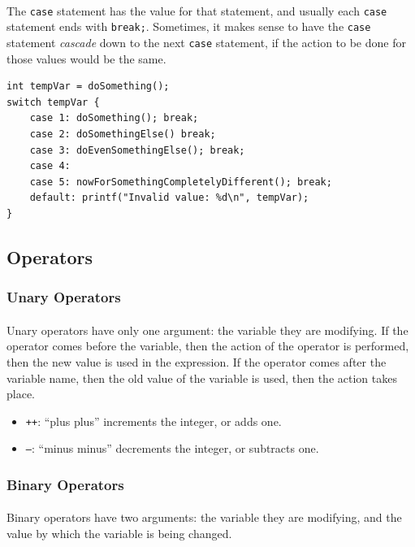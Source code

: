 \documentclass[letter,11pt]{article}
\begin{document}
\paragraph{}The \texttt{case} statement has the value for that statement, and usually each \texttt{case} statement ends with \texttt{break;}. Sometimes, it makes sense to have the \texttt{case} statement \textit{cascade} down to the next \texttt{case} statement, if the action to be done for those values would be the same.

\begin{verbatim}
int tempVar = doSomething();
switch tempVar {
    case 1: doSomething(); break;
    case 2: doSomethingElse() break;
    case 3: doEvenSomethingElse(); break;
    case 4:
    case 5: nowForSomethingCompletelyDifferent(); break;
    default: printf("Invalid value: %d\n", tempVar);
}
\end{verbatim}

\subsection{Operators}

\subsubsection{Unary Operators}
\paragraph{}Unary operators have only one argument: the variable they are modifying. If the operator comes before the variable, then the action of the operator is performed, then the new value is used in the expression. If the operator comes after the variable name, then the old value of the variable is used, then the action takes place.

\begin{itemize}
    \item \texttt{++}: ``plus plus'' increments the integer, or adds one.
    \item \texttt{--}: ``minus minus'' decrements the integer, or subtracts one.
\end{itemize}

\subsubsection{Binary Operators}
\paragraph{}Binary operators have two arguments: the variable they are modifying, and the value by which the variable is being changed.
\end{document}
